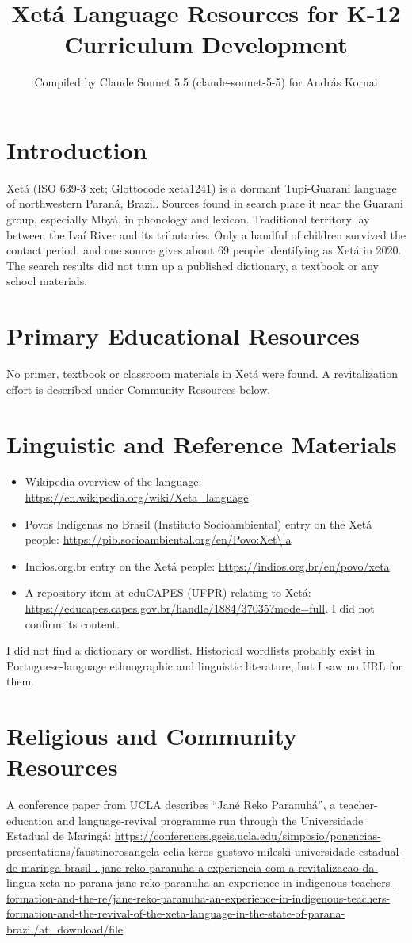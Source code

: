 \documentclass[12pt]{article}
\title{Xet\'a Language Resources for K-12 Curriculum Development}
\author{Compiled by Claude Sonnet 5.5 (claude-sonnet-5-5) for Andr\'as Kornai}
\date{}
\begin{document}
\maketitle

\section{Introduction}
Xet\'a (ISO 639-3 xet; Glottocode xeta1241) is a dormant Tupi-Guarani language of northwestern Paran\'a, Brazil. Sources found in search place it near the Guarani group, especially M\-by\'a, in phonology and lexicon. Traditional territory lay between the Ivaí River and its tributaries. Only a handful of children survived the contact period, and one source gives about 69 people identifying as Xet\'a in 2020. The search results did not turn up a published dictionary, a textbook or any school materials.

\section{Primary Educational Resources}
No primer, textbook or classroom materials in Xet\'a were found. A revitalization effort is described under Community Resources below.

\section{Linguistic and Reference Materials}
\begin{itemize}
\item Wikipedia overview of the language: \url{https://en.wikipedia.org/wiki/Xeta_language}
\item Povos Ind\'igenas no Brasil (Instituto Socioambiental) entry on the Xet\'a people: \url{https://pib.socioambiental.org/en/Povo:Xet\'a}
\item Indios.org.br entry on the Xet\'a people: \url{https://indios.org.br/en/povo/xeta}
\item A repository item at eduCAPES (UFPR) relating to Xet\'a: \url{https://educapes.capes.gov.br/handle/1884/37035?mode=full}. I did not confirm its content.
\end{itemize}
I did not find a dictionary or wordlist. Historical wordlists probably exist in Portuguese-language ethnographic and linguistic literature, but I saw no URL for them.

\section{Religious and Community Resources}
A conference paper from UCLA describes ``Jan\'e Reko Paranuh\'a'', a teacher-education and language-revival programme run through the Universidade Estadual de Maring\'a: \url{https://conferences.gseis.ucla.edu/simposio/ponencias-presentations/faustinorosangela-celia-keros-gustavo-mileski-universidade-estadual-de-maringa-brasil-.-jane-reko-paranuha-a-experiencia-com-a-revitalizacao-da-lingua-xeta-no-parana-jane-reko-paranuha-an-experience-in-indigenous-teachers-formation-and-the-re/jane-reko-paranuha-an-experience-in-indigenous-teachers-formation-and-the-revival-of-the-xeta-language-in-the-state-of-parana-brazil/at_download/file}
\end{document}

